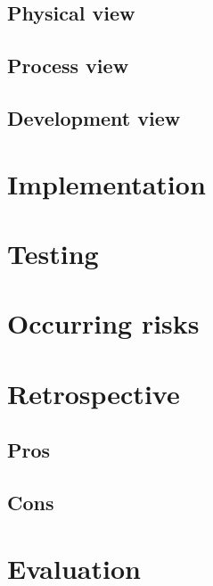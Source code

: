 \subsection{Physical view}
\subsection{Process view}
\subsection{Development view}

\section{Implementation}


\section{Testing}


\section{Occurring risks}
\section{Retrospective}
\subsection{Pros}
\subsection{Cons}
\section{Evaluation}